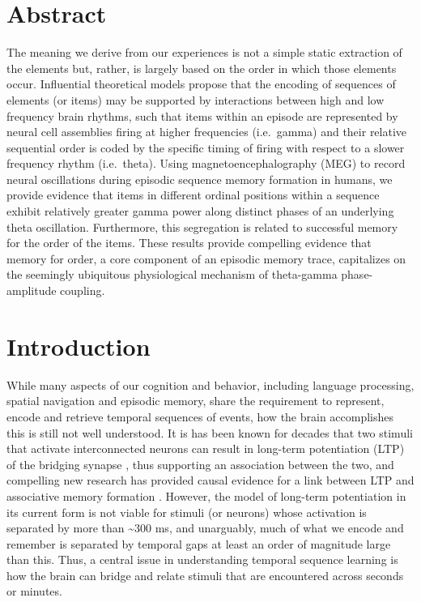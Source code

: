 \section{Abstract}\label{abstract}

The meaning we derive from our experiences is not a simple static
extraction of the elements but, rather, is largely based on the order in
which those elements occur. Influential theoretical models propose that
the encoding of sequences of elements (or items) may be supported by
interactions between high and low frequency brain rhythms, such that
items within an episode are represented by neural cell assemblies firing
at higher frequencies (i.e.~gamma) and their relative sequential order
is coded by the specific timing of firing with respect to a slower
frequency rhythm (i.e.~theta). Using magnetoencephalography (MEG) to
record neural oscillations during episodic sequence memory formation in
humans, we provide evidence that items in different ordinal positions
within a sequence exhibit relatively greater gamma power along distinct
phases of an underlying theta oscillation. Furthermore, this segregation
is related to successful memory for the order of the items. These
results provide compelling evidence that memory for order, a core
component of an episodic memory trace, capitalizes on the seemingly
ubiquitous physiological mechanism of theta-gamma phase-amplitude
coupling.

\section{Introduction}\label{introduction}

While many aspects of our cognition and behavior, including language
processing, spatial navigation and episodic memory, share the
requirement to represent, encode and retrieve temporal sequences of
events, how the brain accomplishes this is still not well understood. It
is has been known for decades that two stimuli that activate
interconnected neurons can result in long-term potentiation (LTP) of the
bridging synapse \autocite{bliss_long-lasting_1973}, thus supporting an
association between the two, and compelling new research has provided
causal evidence for a link between LTP and associative memory formation
\autocite{nabavi_engineering_2014}. However, the model of long-term
potentiation in its current form is not viable for stimuli (or neurons)
whose activation is separated by more than \textasciitilde{}300 ms, and
unarguably, much of what we encode and remember is separated by temporal
gaps at least an order of magnitude large than this. Thus, a central
issue in understanding temporal sequence learning is how the brain can
bridge and relate stimuli that are encountered across seconds or
minutes.

